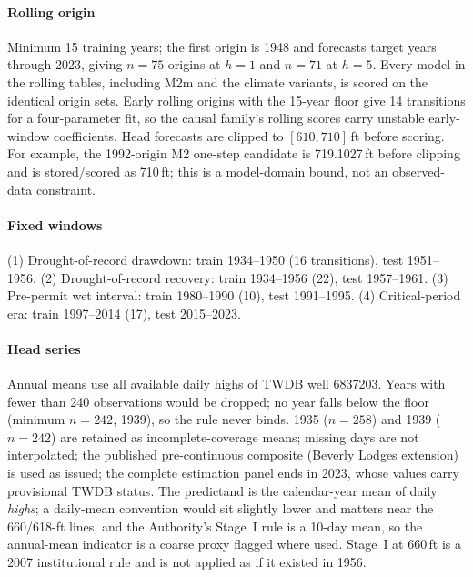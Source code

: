 \paragraph{Rolling origin} Minimum 15 training years; the first origin is 1948 and forecasts target years through 2023, giving $n=75$ origins at $h=1$ and $n=71$ at $h=5$. Every model in the rolling tables, including M2m and the climate variants, is scored on the identical origin sets. Early rolling origins with the 15-year floor give 14 transitions for a four-parameter fit, so the causal family's rolling scores carry unstable early-window coefficients. Head forecasts are clipped to $[610,710]$\,ft before scoring. For example, the 1992-origin M2 one-step candidate is 719.1027\,ft before clipping and is stored/scored as 710\,ft; this is a model-domain bound, not an observed-data constraint.

\paragraph{Fixed windows} (1) Drought-of-record drawdown: train 1934--1950 (16 transitions), test 1951--1956. (2) Drought-of-record recovery: train 1934--1956 (22), test 1957--1961. (3) Pre-permit wet interval: train 1980--1990 (10), test 1991--1995. (4) Critical-period era: train 1997--2014 (17), test 2015--2023.

\paragraph{Head series} Annual means use all available daily highs of TWDB well 6837203. Years with fewer than 240 observations would be dropped; no year falls below the floor (minimum $n=242$, 1939), so the rule never binds. 1935 ($n=258$) and 1939 ($n=242$) are retained as incomplete-coverage means; missing days are not interpolated; the published pre-continuous composite (Beverly Lodges extension) is used as issued; the complete estimation panel ends in 2023, whose values carry provisional TWDB status. The predictand is the calendar-year mean of daily \emph{highs}; a daily-mean convention would sit slightly lower and matters near the 660/618-ft lines, and the Authority's Stage~I rule is a 10-day mean, so the annual-mean indicator is a coarse proxy flagged where used. Stage~I at 660\,ft is a 2007 institutional rule and is not applied as if it existed in 1956.


